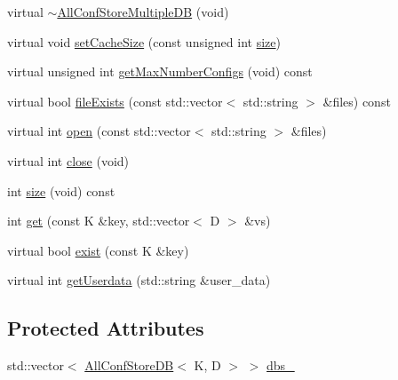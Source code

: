 \begin{DoxyCompactItemize}
\item 
virtual \mbox{\hyperlink{classFILEDB_1_1AllConfStoreMultipleDB_a88489be8d488c6fe3a88312f200e7fdd}{$\sim$\+All\+Conf\+Store\+Multiple\+DB}} (void)
\item 
virtual void \mbox{\hyperlink{classFILEDB_1_1AllConfStoreMultipleDB_a746ef51b2dedf529a8e85528c0d31bfc}{set\+Cache\+Size}} (const unsigned int \mbox{\hyperlink{classFILEDB_1_1AllConfStoreMultipleDB_af05105b1ffe17093556a209ac9db1ed9}{size}})
\item 
virtual unsigned int \mbox{\hyperlink{classFILEDB_1_1AllConfStoreMultipleDB_a9348ec8716b4c716df67dca608bb1bde}{get\+Max\+Number\+Configs}} (void) const
\item 
virtual bool \mbox{\hyperlink{classFILEDB_1_1AllConfStoreMultipleDB_aa5a7c38b3785226da6f30a4ab5e51428}{file\+Exists}} (const std\+::vector$<$ std\+::string $>$ \&files) const
\item 
virtual int \mbox{\hyperlink{classFILEDB_1_1AllConfStoreMultipleDB_aa006283e8d6f0f079ca234c369f53679}{open}} (const std\+::vector$<$ std\+::string $>$ \&files)
\item 
virtual int \mbox{\hyperlink{classFILEDB_1_1AllConfStoreMultipleDB_a71aed1deeb31450afee4b692941dbae1}{close}} (void)
\item 
int \mbox{\hyperlink{classFILEDB_1_1AllConfStoreMultipleDB_af05105b1ffe17093556a209ac9db1ed9}{size}} (void) const
\item 
int \mbox{\hyperlink{classFILEDB_1_1AllConfStoreMultipleDB_a3a9858458bf0ecc76133e1c448568cf5}{get}} (const K \&key, std\+::vector$<$ D $>$ \&vs)
\item 
virtual bool \mbox{\hyperlink{classFILEDB_1_1AllConfStoreMultipleDB_a5c9333af45c37c53c863ad2a07a9843b}{exist}} (const K \&key)
\item 
virtual int \mbox{\hyperlink{classFILEDB_1_1AllConfStoreMultipleDB_a9a314fba1056c35ffe54e35e98e83523}{get\+Userdata}} (std\+::string \&user\+\_\+data)
\end{DoxyCompactItemize}
\subsection*{Protected Attributes}
\begin{DoxyCompactItemize}
\item 
std\+::vector$<$ \mbox{\hyperlink{classFILEDB_1_1AllConfStoreDB}{All\+Conf\+Store\+DB}}$<$ K, D $>$ $>$ \mbox{\hyperlink{classFILEDB_1_1AllConfStoreMultipleDB_ae3a7f9bd3ad0f4bb998e8880b81305c2}{dbs\+\_\+}}
\end{DoxyCompactItemize}


